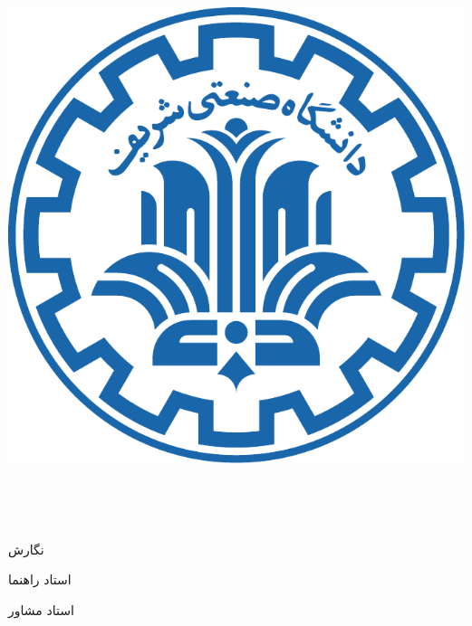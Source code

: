 

\begin{center}

\includegraphics[scale=0.25]{front/template/images/logo}

\vspace{-0.2cm}
\ThesisUniversity \\[-0.3em]
\ThesisDepartment

\begin{large}
\vspace{0.5cm}

\ThesisType \ \ThesisDegree \\[-0.3em]
\ThesisMajor

\end{large}

\vspace{2cm}

{\LARGE\textbf{\ThesisTitle}}

\vspace{2.5cm}

{نگارش}\\[.5em]
{\large\textbf{\ThesisAuthor}}

\vspace{0.7cm}

{استاد راهنما}\\[.5em]
{\large\textbf{\ThesisSupervisor}}

\vspace{0.7cm}

{استاد مشاور}\\[.5em]
{\large\textbf{\ThesisAdvisor}}

\vspace{1.3cm}

\ThesisDate

\thispagestyle{empty} %
\end{center}

